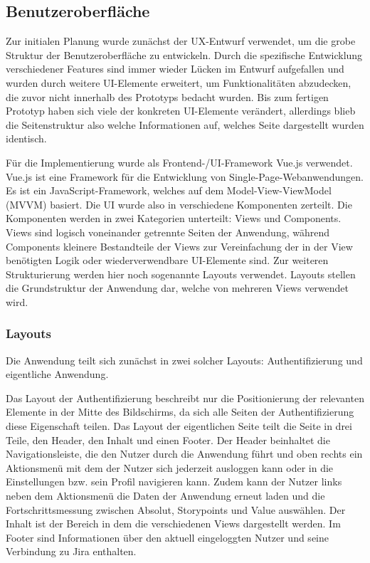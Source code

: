 \subsection{Benutzeroberfläche}
Zur initialen Planung wurde zunächst der UX-Entwurf verwendet, um die grobe Struktur der Benutzeroberfläche zu entwickeln. Durch die spezifische Entwicklung verschiedener Features sind immer wieder Lücken im Entwurf aufgefallen und wurden durch weitere UI-Elemente erweitert, um Funktionalitäten abzudecken, die zuvor nicht innerhalb des Prototyps bedacht wurden. Bis zum fertigen Prototyp haben sich viele der konkreten UI-Elemente verändert, allerdings blieb die Seitenstruktur also welche Informationen auf, welches Seite dargestellt wurden identisch.

Für die Implementierung wurde als Frontend-/UI-Framework Vue.js verwendet. Vue.js ist eine Framework für die Entwicklung von Single-Page-Webanwendungen. Es ist ein JavaScript-Framework, welches auf dem Model-View-ViewModel (MVVM) basiert. Die UI wurde also in verschiedene Komponenten zerteilt. Die Komponenten werden in zwei Kategorien unterteilt: Views und Components. Views sind logisch voneinander getrennte Seiten der Anwendung, während Components kleinere Bestandteile der Views zur Vereinfachung der in der View benötigten Logik oder wiederverwendbare UI-Elemente sind. Zur weiteren Strukturierung werden hier noch sogenannte Layouts verwendet. Layouts stellen die Grundstruktur der Anwendung dar, welche von mehreren Views verwendet wird.

\subsubsection{Layouts}
Die Anwendung teilt sich zunächst in zwei solcher Layouts: Authentifizierung und eigentliche Anwendung.

Das Layout der Authentifizierung beschreibt nur die Positionierung der relevanten Elemente in der Mitte des Bildschirms, da sich alle Seiten der Authentifizierung diese Eigenschaft teilen.
Das Layout der eigentlichen Seite teilt die Seite in drei Teile, den Header, den Inhalt und einen Footer. Der Header beinhaltet die Navigationsleiste, die den Nutzer durch die Anwendung führt und oben rechts ein Aktionsmenü mit dem der Nutzer sich jederzeit ausloggen kann oder in die Einstellungen bzw. sein Profil navigieren kann. Zudem kann der Nutzer links neben dem Aktionsmenü die Daten der Anwendung erneut laden und die Fortschrittsmessung zwischen Absolut, Storypoints und Value auswählen. Der Inhalt ist der Bereich in dem die verschiedenen Views dargestellt werden. Im Footer sind Informationen über den aktuell eingeloggten Nutzer und seine Verbindung zu Jira enthalten.

